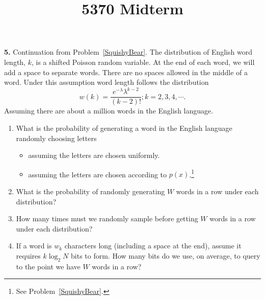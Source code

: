\documentclass{assignment}
\begin{document}
\title{5370 Midterm}


\textbf{5.} \label{NewToyYoda}
Continuation from Problem~\ref{SquishyBear}.
The distribution of English word length, $k$, is a shifted Poisson random variable. At the end of each word, we will add a space to separate words. There are no spaces allowed in the middle of a word. Under this assumption word length follows the distribution
$$ w(k)=\frac{e^{-\lambda}\lambda^{k-2} }{(k-2)!} ; k=2,3,4,\cdots.$$
Assuming there are about a million words in the English language.
\begin{enumerate}
\item What is the probability of generating a word in the English language randomly choosing letters
  \begin{itemize}
  \item assuming the letters are chosen uniformly.
  \item assuming the letters are chosen according to $p(x)$.\footnote{
      See Problem~\ref{SquishyBear}.
    }
  \end{itemize}
\item What is the probability of randomly generating $W$ words in a row under each distribution?
\item How many times must we randomly sample before getting $W$ words in a row under each distribution?
\item If a word is $w_k$ characters long (including a space at the end), assume it requires $k \log_2 N$ bits to form. How many bits do we use, on average, to query to the point we have $W$ words in a row?
\end{enumerate}
\end{document}
